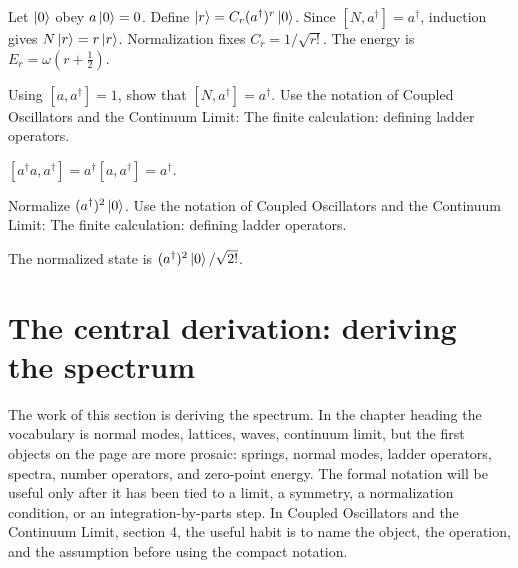 \begin{example}
Let \(\left|0\right\rangle\) obey \(a\left|0\right\rangle=0\).  Define \(\left|r\right\rangle=C_r(a^\dagger)^r\left|0\right\rangle\).  Since \([N,a^\dagger]=a^\dagger\), induction gives \(N\left|r\right\rangle=r\left|r\right\rangle\).  Normalization fixes \(C_r=1/\sqrt{r!}\).  The energy is \(E_r=\omega(r+\frac12)\).
\end{example}



\begin{exercise}
Using \([a,a^\dagger]=1\), show that \([N,a^\dagger]=a^\dagger\).  Use the notation of Coupled Oscillators and the Continuum Limit: The finite calculation: defining ladder operators.
\begin{answer}
\([a^\dagger a,a^\dagger]=a^\dagger[a,a^\dagger]=a^\dagger\).
\end{answer}
\end{exercise}

\begin{exercise}
Normalize \((a^\dagger)^2\left|0\right\rangle\).  Use the notation of Coupled Oscillators and the Continuum Limit: The finite calculation: defining ladder operators.
\begin{answer}
The normalized state is \((a^\dagger)^2\left|0\right\rangle/\sqrt{2!}\).
\end{answer}
\end{exercise}



\section{The central derivation: deriving the spectrum}













The work of this section is deriving the spectrum.  In the chapter heading the vocabulary is normal modes, lattices, waves, continuum limit, but the first objects on the page are more prosaic: springs, normal modes, ladder operators, spectra, number operators, and zero-point energy.  The formal notation will be useful only after it has been tied to a limit, a symmetry, a normalization condition, or an integration-by-parts step.  In Coupled Oscillators and the Continuum Limit, section 4, the useful habit is to name the object, the operation, and the assumption before using the compact notation.


